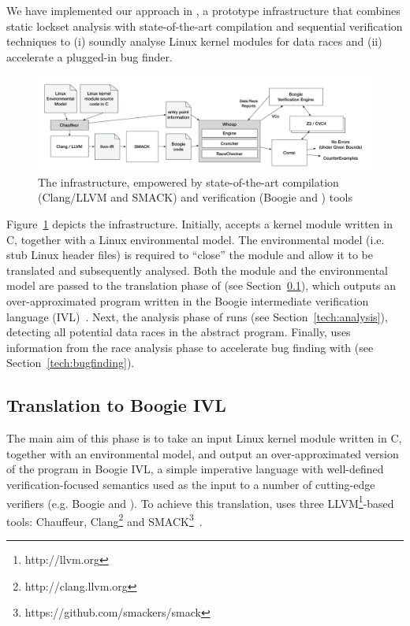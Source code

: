 We have implemented our approach in \whoop, a prototype infrastructure that combines static lockset analysis with state-of-the-art compilation and sequential verification techniques to (i) soundly analyse Linux kernel modules for data races and (ii) accelerate a plugged-in bug finder.

\begin{figure}
\centering
\includegraphics[width=.99\linewidth]{img/whoop.pdf}
\caption{The \whoop infrastructure, empowered by state-of-the-art compilation (Clang/LLVM and SMACK) and verification (Boogie and \corral) tools}
\label{fig:whoop}
\end{figure}

Figure~\ref{fig:whoop} depicts the \whoop infrastructure. Initially, \whoop accepts a kernel module written in C, together with a Linux environmental model. The environmental model (i.e. stub Linux header files) is required to ``close'' the module and allow it to be translated and subsequently analysed. Both the module and the environmental model are passed to the translation phase of \whoop (see Section~\ref{tech:translation}), which outputs an over-approximated program written in the Boogie intermediate verification language (IVL)~\cite{deline2005boogiepl}. Next, the analysis phase of \whoop runs (see Section~\ref{tech:analysis}), detecting all potential data races in the abstract program. Finally, \whoop uses information from the race analysis phase to accelerate bug finding with \corral (see Section~\ref{tech:bugfinding}).

\subsection{Translation to Boogie IVL}
\label{tech:translation}

The main aim of this phase is to take an input Linux kernel module written in C, together with an environmental model, and output an over-approximated version of the program in Boogie IVL, a simple imperative language with well-defined verification-focused semantics used as the input to a number of cutting-edge verifiers (e.g. Boogie and \corral). To achieve this translation, \whoop uses three LLVM\footnote{http://llvm.org}-based tools: Chauffeur, Clang\footnote{http://clang.llvm.org} and SMACK\footnote{https://github.com/smackers/smack}~\cite{rakamaric2014smack}.

